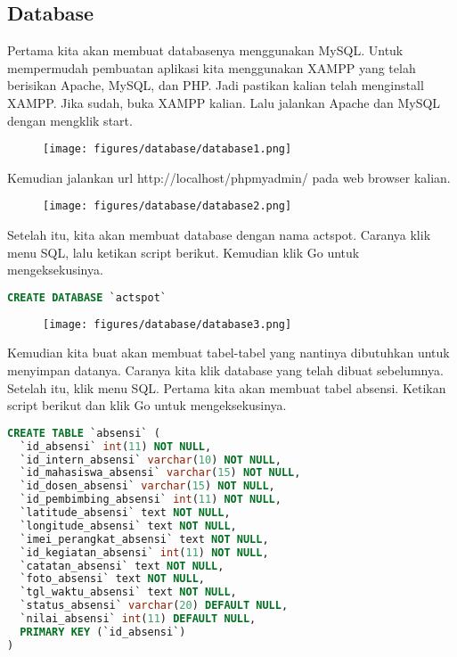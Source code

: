 \subsection{Database}

Pertama kita akan membuat databasenya menggunakan MySQL. Untuk mempermudah pembuatan aplikasi kita menggunakan XAMPP yang telah berisikan Apache, MySQL, dan PHP. Jadi pastikan kalian telah menginstall XAMPP. Jika sudah, buka XAMPP kalian. Lalu jalankan Apache dan MySQL dengan mengklik start.

\begin{figure}[H]
	\centering
	\texttt{[image: figures/database/database1.png]}
\end{figure}

\noindent
Kemudian jalankan url http://localhost/phpmyadmin/ pada web browser kalian.

\begin{figure}[H]
\centering
\texttt{[image: figures/database/database2.png]}
\end{figure}

\noindent
Setelah itu, kita akan membuat database dengan nama actspot. Caranya klik menu SQL, lalu ketikan script berikut. Kemudian klik Go untuk mengeksekusinya.
\begin{lstlisting}[language=SQL]
CREATE DATABASE `actspot`
\end{lstlisting}

\begin{figure}[H]
\centering
\texttt{[image: figures/database/database3.png]}
\end{figure}

\noindent
Kemudian kita buat akan membuat tabel-tabel yang nantinya dibutuhkan untuk menyimpan datanya. Caranya kita klik database yang telah dibuat sebelumnya. Setelah itu, klik menu SQL. Pertama kita akan membuat tabel absensi. Ketikan script berikut dan klik Go untuk mengeksekusinya.

\begin{lstlisting}[language=SQL]
CREATE TABLE `absensi` (
  `id_absensi` int(11) NOT NULL,
  `id_intern_absensi` varchar(10) NOT NULL,
  `id_mahasiswa_absensi` varchar(15) NOT NULL,
  `id_dosen_absensi` varchar(15) NOT NULL,
  `id_pembimbing_absensi` int(11) NOT NULL,
  `latitude_absensi` text NOT NULL,
  `longitude_absensi` text NOT NULL,
  `imei_perangkat_absensi` text NOT NULL,
  `id_kegiatan_absensi` int(11) NOT NULL,
  `catatan_absensi` text NOT NULL,
  `foto_absensi` text NOT NULL,
  `tgl_waktu_absensi` text NOT NULL,
  `status_absensi` varchar(20) DEFAULT NULL,
  `nilai_absensi` int(11) DEFAULT NULL,
  PRIMARY KEY (`id_absensi`)
)
\end{lstlisting}

